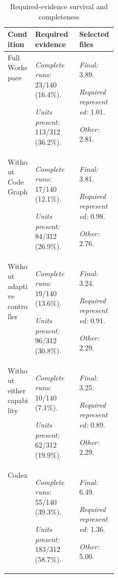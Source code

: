 \begin{table}[htbp]
\centering
\caption{Required-evidence survival and completeness}
\label{tab:required-evidence-survival-and-completeness-4}

\begingroup
\small
\setlength{\tabcolsep}{4pt}
\renewcommand{\arraystretch}{1.12}
\begin{tabularx}{\linewidth}{@{}L{0.25\linewidth}YY@{}}
\toprule
\textbf{Condition} & \textbf{Required evidence} & \textbf{Selected files} \\
\midrule
Full Workspace
& \textit{Complete runs:} 23/140 (16.4\%).
  \par\textit{Units present:} 113/312 (36.2\%).
& \textit{Final:} 3.89.
  \par\textit{Required represented:} 1.01.
  \par\textit{Other:} 2.81. \\

Without CodeGraph
& \textit{Complete runs:} 17/140 (12.1\%).
  \par\textit{Units present:} 84/312 (26.9\%).
& \textit{Final:} 3.81.
  \par\textit{Required represented:} 0.98.
  \par\textit{Other:} 2.76. \\

Without adaptive controller
& \textit{Complete runs:} 19/140 (13.6\%).
  \par\textit{Units present:} 96/312 (30.8\%).
& \textit{Final:} 3.24.
  \par\textit{Required represented:} 0.91.
  \par\textit{Other:} 2.29. \\

Without either capability
& \textit{Complete runs:} 10/140 (7.1\%).
  \par\textit{Units present:} 62/312 (19.9\%).
& \textit{Final:} 3.25.
  \par\textit{Required represented:} 0.89.
  \par\textit{Other:} 2.29. \\

Codex
& \textit{Complete runs:} 55/140 (39.3\%).
  \par\textit{Units present:} 183/312 (58.7\%).
& \textit{Final:} 6.49.
  \par\textit{Required represented:} 1.36.
  \par\textit{Other:} 5.00. \\
\bottomrule
\end{tabularx}
\endgroup
\end{table}
\FloatBarrier

